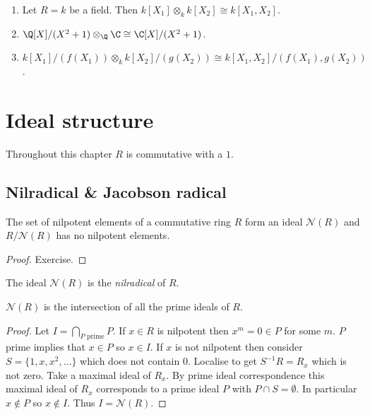 \documentclass[a4paper]{article}
\newcommand{\nilrad}[1]{\mathcal{N}({#1})} %
\begin{document}
\begin{eg}\leavevmode
  \begin{enumerate}
  \item Let \(R = k\) be a field. Then \(k[X_1] \otimes_k k[X_2] \cong k[X_1, X_2]\).
  \item \(\Q[X]/(X^2 + 1) \otimes_\Q \C \cong \C[X]/(X^2 + 1)\).
  \item \(k[X_1]/(f(X_1)) \otimes_k k[X_2]/(g(X_2)) \cong k[X_1, X_2]/(f(X_1), g(X_2))\).
  \end{enumerate}
\end{eg}

\section{Ideal structure}

Throughout this chapter \(R\) is commutative with a \(1\).

\subsection{Nilradical \& Jacobson radical}

\begin{lemma}
  The set of nilpotent elements of a commutative ring \(R\) form an ideal \(\mathcal N(R)\) and \(R/\nilrad R\) has no nilpotent elements.
\end{lemma}

\begin{proof}
  Exercise.
\end{proof}

\begin{definition}[nilradical]
  The ideal \(\nilrad R\) is the \emph{nilradical} of \(R\).
\end{definition}

\begin{lemma}[Krull]
  \(\nilrad R\) is the intersection of all the prime ideals of \(R\).
\end{lemma}

\begin{proof}
  Let \(I = \bigcap_{P \text{ prime}} P\). If \(x \in R\) is nilpotent then \(x^m = 0 \in P\) for some \(m\). \(P\) prime implies that \(x \in P\) so \(x \in I\). If \(x\) is not nilpotent then consider \(S = \{1, x, x^2, \dots\}\) which does not contain \(0\). Localise to get \(S^{-1}R = R_x\) which is not zero. Take a maximal ideal of \(R_x\). By prime ideal correspondence this maximal ideal of \(R_x\) corresponds to a prime ideal \(P\) with \(P \cap S = \emptyset\). In particular \(x \notin P\) so \(x \notin I\). Thus \(I = \nilrad R\).
\end{proof}
\end{document}
